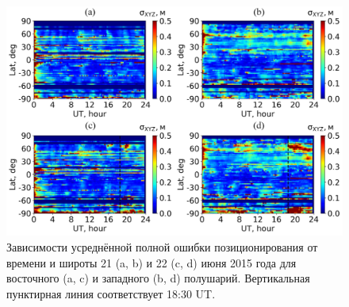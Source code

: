 \begin{figure}[h]
\includegraphics[width=\textwidth]{fig/2015-172-173.png}    
\caption{Зависимости усреднённой полной ошибки позиционирования от времени и широты 21 (a, b) и 22 (c, d) июня 2015 года для восточного (a, c) и западного (b, d) полушарий. Вертикальная пунктирная линия соответствует 18:30 UT.} 
\label{fig-2015-172-173}      
\end{figure} 